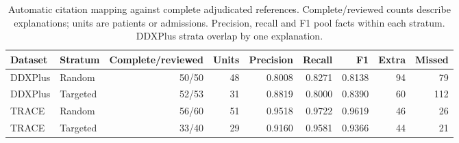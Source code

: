 \begin{table}[!tbp]\centering\footnotesize
\caption{Automatic citation mapping against complete adjudicated references. Complete/reviewed counts describe explanations; units are patients or admissions. Precision, recall and F1 pool facts within each stratum. DDXPlus strata overlap by one explanation.}
\label{tab:adjudicated-quality}
\begin{tabular}{llrrrrrrr}\toprule
Dataset & Stratum & Complete/reviewed & Units & Precision & Recall & F1 & Extra & Missed\\\midrule
DDXPlus & Random & 50/50 & 48 & 0.8008 & 0.8271 & 0.8138 & 94 & 79 \\
DDXPlus & Targeted & 52/53 & 31 & 0.8819 & 0.8000 & 0.8390 & 60 & 112 \\
TRACE & Random & 56/60 & 51 & 0.9518 & 0.9722 & 0.9619 & 46 & 26 \\
TRACE & Targeted & 33/40 & 29 & 0.9160 & 0.9581 & 0.9366 & 44 & 21 \\
\bottomrule\end{tabular}
\end{table}
